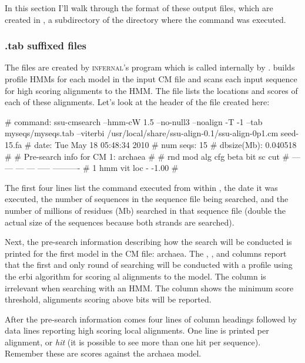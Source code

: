 In this section I'll walk through the format of these output files,
which are created in , a subdirectory of the directory
where the  command was executed.

\subsubsection{.tab suffixed files}

The  files are created by \textsc{infernal}'s
 program which is called internally by
.  builds profile HMMs for each model
in the input CM file and scans each input sequence for high scoring
alignments to the HMM\@. The  file lists the locations and
scores of each of these alignments. Let's look at the header of the 
 file created here:

\begin{sreoutput}
# command:    ssu-cmsearch --hmm-cW 1.5 --no-null3 --noalign -T -1 --tab myseqs/myseqs.tab --viterbi /usr/local/share/ssu-align-0.1/ssu-align-0p1.cm seed-15.fa
# date:       Tue May 18 05:48:34 2010
# num seqs:   15
# dbsize(Mb): 0.040518
#
# Pre-search info for CM 1: archaea
#
# rnd  mod  alg  cfg   beta  bit sc cut
# ---  ---  ---  ---  -----  ----------
#   1  hmm  vit  loc      -       -1.00
#
\end{sreoutput}

The first four lines list the  command executed from
within , the date it was executed, the number of
sequences in the sequence file being searched, and the number of
millions of residues (Mb) searched in that sequence file (double the
actual size of the sequences because both strands are searched).

Next, the pre-search information describing how the search will be
conducted is printed for the first model in the CM file: archaea. 
The , ,  and  columns report
that the first and only round of searching will be conducted with a
profile  using the erbi algorithm for scoring
al alignments to the model. The 
column is irrelevant when searching with an HMM\@. The 
column shows the minimum score threshold, alignments scoring above
 bits will be reported.

After the pre-search information comes four lines of column headings
followed by data lines reporting high scoring local alignments. One
line is printed per alignment, or \emph{hit} (it is possible to see
more than one hit per sequence). Remember these are scores against the
archaea model.

